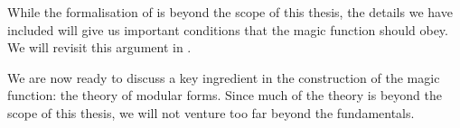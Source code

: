 While the formalisation of  is beyond the scope of this thesis, the details we have included will give us important conditions that the magic function should obey. We will revisit this argument in .

We are now ready to discuss a key ingredient in the construction of the magic function: the theory of modular forms. Since much of the theory is beyond the scope of this thesis, we will not venture too far beyond the fundamentals.
